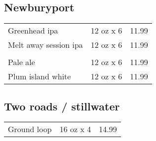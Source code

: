 \documentclass{article}%
\begin{document}
\begin{multicols}{3}
%
\subsection*{Newburyport}%
\begin{tabular}{l c r}%
Greenhead ipa&12 oz x 6&11.99\\%
\multirow{1}{15ex}{Melt away session ipa}&12 oz x 6&11.99\\%
&&\\%
Pale ale&12 oz x 6&11.99\\%
Plum island white&12 oz x 6&11.99\\%
\end{tabular}

%
\subsection*{Two roads / stillwater}%
\begin{tabular}{l c r}%
Ground loop&16 oz x 4&14.99\\%
\end{tabular}

%
\end{multicols}%
\end{document}
